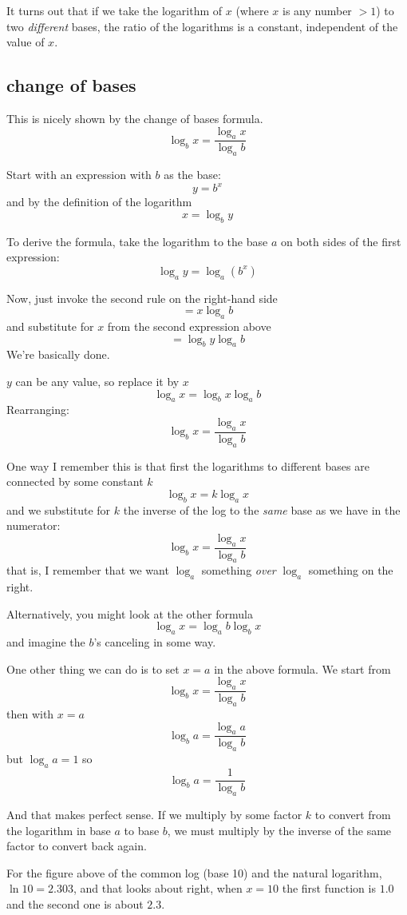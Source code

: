 \documentclass[11pt, oneside]{article}
\begin{document}
It turns out that if we take the logarithm of $x$ (where $x$ is any number $> 1$) to two \emph{different} bases, the ratio of the logarithms is a constant, independent of the value of $x$.  

\subsection*{change of bases}

This is nicely shown by the change of bases formula.
\[ \log_b x = \frac{\log_a x}{\log_a b} \]

Start with an expression with $b$ as the base:
\[ y = b^x \]
and by the definition of the logarithm
\[ x = \log_b y \]

To derive the formula, take the logarithm to the base $a$ on both sides of the first expression:
\[ \log_a y = \log_a (b^x) \]

Now, just invoke the second rule on the right-hand side
\[ = x \log_a b \]
and substitute for $x$ from the second expression above
\[ = \log_b y \log_a b \]
We're basically done.

$y$ can be any value, so replace it by $x$
\[ \log_a x = \log_b x \log_a b \]
Rearranging:
\[ \log_b x = \frac{\log_a x}{\log_a b} \]

One way I remember this is that first the logarithms to different bases are connected by some constant $k$
\[ \log_b x = k \log_a x \]
and we substitute for $k$ the inverse of the log to the \emph{same} base as we have in the numerator:
\[ \log_b x = \frac{\log_a x}{\log_a b} \]
that is, I remember that we want $\log_a$ something \emph{over }$\log_a$ something on the right. 

Alternatively, you might look at the other formula
\[ \log_a x = \log_a b \log_b x  \]
and imagine the $b$'s canceling in some way.

One other thing we can do is to set $x=a$ in the above formula.  We start from
\[ \log_b x = \frac{\log_a x}{\log_a b} \]
then with $x=a$
\[ \log_b a = \frac{\log_a a}{\log_a b} \]
but $\log_a a = 1$ so
\[ \log_b a = \frac{1}{\log_a b} \]

And that makes perfect sense.  If we multiply by some factor $k$ to convert from the logarithm in base $a$ to base $b$, we must multiply by the inverse of the same factor to convert back again.

For the figure above of the common log (base 10) and the natural logarithm, $\ln 10 = 2.303$, and that looks about right, when $x=10$ the first function is $1.0$ and the second one is about $2.3$.
\end{document}
